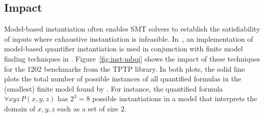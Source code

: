 \documentclass{easychair}
\begin{document}
\subsection{Impact}
Model-based instantiation often enables SMT solvers to
establish the satisfiability of inputs where exhaustive instantiation is infeasible.
In~\cite{ReyEtAl-CADE-13}, an implementation of model-based quantifier instantiation is used
in conjunction with finite model finding techniques in \cvc.
Figure~\ref{fig:inst-mbqi} shows the impact of these techniques for the 1202
benchmarks from the TPTP library.
In both plots, the solid line plots the total number of possible instances of all quantified formulas
in the (smallest) finite model found by \cvc.
For instance, the quantified formula $\forall xyz\, P( x, y, z )$ has $2^3 = 8$ possible instantiations
in a model that interprets the domain of $x,y,z$ each as a set of size $2$.
\end{document}

